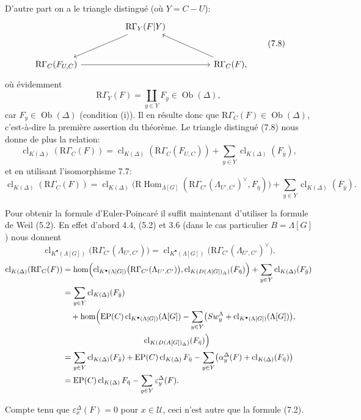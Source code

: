 \documentclass[11pt]{article}
\DeclareMathOperator{\Hom}{Hom}
\providecommand{\cl}{\operatorname{cl}}
\providecommand{\EP}{\operatorname{EP}}
\providecommand{\Hom}{\operatorname{Hom}}
\providecommand{\cl}{\operatorname{cl}}
\providecommand{\EP}{\operatorname{EP}}
\providecommand{\clK}[1]{\operatorname{cl}_{K(#1)}}
\providecommand{\clKstar}[1]{\operatorname{cl}_{K^{\bullet}(#1)}}
\providecommand{\Hom}{\operatorname{Hom}}
\providecommand{\cl}{\operatorname{cl}}
\begin{document}
D'autre part on a le triangle distingué (où $Y=C-U$):
\[
\begin{tikzcd}[column sep=huge,row sep=large]
& \mathrm{R}\Gamma_Y(F|Y) \arrow[dl] & \\
\mathrm{R}\Gamma_C(F_{U,C}) \arrow[rr] && \mathrm{R}\Gamma_C(F), \arrow[ul]
\end{tikzcd}
\tag{7.8}
\]
où évidemment
\[
\mathrm{R}\Gamma_Y(F)=\coprod_{y\in Y}F_y\in\operatorname{Ob}(\Delta),
\]
car $F_y\in\operatorname{Ob}(\Delta)$ (condition (i)). Il en résulte donc que $\mathrm{R}\Gamma_C(F)\in\operatorname{Ob}(\Delta)$, c'est-à-dire la première assertion du théorème. Le triangle distingué (7.8) nous donne de plus la relation:
\[
\clK{\Delta}(\mathrm{R}\Gamma_C(F))
=
\clK{\Delta}(\mathrm{R}\Gamma_C(F_{U,C}))
+\sum_{y\in Y}\clK{\Delta}(F_{\bar y}),
\]
et en utilisant l'isomorphisme 7.7:
\[
\clK{\Delta}(\mathrm{R}\Gamma_C(F))
=
\clK{\Delta}\bigl(\mathrm{R}\Hom_{\Lambda[G]}(\mathrm{R}\Gamma_{C'}(\Lambda_{U',C'})^\vee,F_{\bar\eta})\bigr)
+\sum_{y\in Y}\clK{\Delta}(F_{\bar y}).
\]

Pour obtenir la formule d'Euler-Poincaré il suffit maintenant d'utiliser la formule de Weil (5.2). En effet d'abord 4.4, (5.2) et 3.6 (dans le cas particulier $B=\Lambda[G]$) nous donnent
\[
\clKstar{\Lambda[G]}\bigl(\mathrm{R}\Gamma_{C'}(\Lambda_{U',C'})\bigr)
=
\clKstar{\Lambda[G]}\bigl(\mathrm{R}\Gamma_{C'}(\Lambda_{U',C'})^\vee\bigr).
\]
\[
\begin{aligned}
\clK{\Delta}(\mathrm{R}\Gamma_C(F))
&=\operatorname{hom}\Bigl(
\clKstar{\Lambda[G]}\bigl(\mathrm{R}\Gamma_{C'}(\Lambda_{U',C'})\bigr),
\cl_{K(D(A[G])_\Delta)}(F_{\bar\eta})\Bigr)
 +\sum_{y\in Y}\clK{\Delta}(F_{\bar y})\\
&=\sum_{y\in Y}\clK{\Delta}(F_{\bar y})\\
&\quad +\operatorname{hom}\Bigl(
\EP(C)\clKstar{\Lambda[G]}(\Lambda[G])
 -\sum_{y\in Y}\bigl(Sw_y^{\Lambda}+\clKstar{\Lambda[G]}(\Lambda[G])\bigr),\\
&\hspace{10em}\cl_{K(D(A[G])_\Delta)}(F_{\bar\eta})\Bigr)\\
&=\sum_{y\in Y}\clK{\Delta}(F_{\bar y})
 +\EP(C)\clK{\Delta}F_{\bar\eta}
 -\sum_{y\in Y}\bigl(\alpha_y^\Delta(F)+\clK{\Delta}(F_{\bar\eta})\bigr)\\
&=\EP(C)\clK{\Delta}F_{\bar\eta}
 -\sum_{y\in Y}\varepsilon_y^\Delta(F).
\end{aligned}
\]

Compte tenu que $\varepsilon_x^\Delta(F)=0$ pour $x\in\mathcal U$, ceci n'est autre que la formule (7.2).
\end{document}
